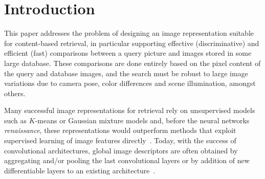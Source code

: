 \section{Introduction}



This paper addresses the problem of designing an image representation suitable for content-based retrieval, in particular supporting effective (discriminative) and
efficient (fast) comparisons between a query picture and images stored in some large database.
These comparisons are done entirely based on the pixel content of the query and database images, and the search must be robust to large image variations due to camera pose, color differences and scene illumination, amongst others.


Many successful image representations for retrieval rely on unsupervised models such as $K$-means \cite{Delhumeau2013} or Gaussian mixture models \cite{Perronnin2010,PeSan10} and, before the neural networks \textit{renaissance}, these representations would outperform methods that exploit supervised learning of image features directly~\cite{Bilen2015,Rana}.
Today, with the success of convolutional architectures, global image descriptors are often obtained by aggregating and/or pooling the last convolutional layers \cite{babenko15,GoAlReLa16,KaMeOs16} or by addition of new differentiable layers to an existing architecture~\cite{Arandjelovic15}.

